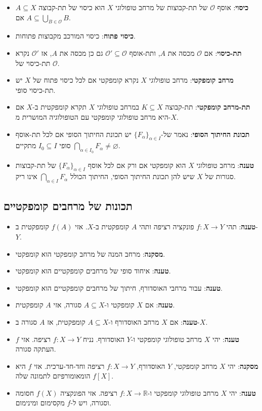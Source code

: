 \documentclass{tstextbook}
\begin{document}
\begin{summary}
  \begin{itemize}
    \item \textbf{כיסוי}: אוסף \(\mathcal{O}\) של תת-קבוצות של מרחב טופולוגי \(X\) הוא כיסוי של תת-קבוצה \(A \subseteq X\) אם \(A\subseteq \bigcup_{ B \in \mathcal{O}}B\).
    \item \textbf{כיסוי פתוח}: כיסוי המורכב מקבוצות פתוחות.
    \item \textbf{תת-כיסוי}: אם \(\mathcal{O}\) מכסה את \(A\), ותת-אוסף \(\mathcal{O}' \subseteq \mathcal{O}\) גם כן מכסה את \(A\), אז \(\mathcal{O}'\) נקרא תת-כיסוי של \(\mathcal{O}\).
    \item \textbf{מרחב קומפקטי}: מרחב טופולוגי \(X\) נקרא קומפקטי אם לכל כיסוי פתוח של \(X\) יש תת-כיסוי סופי.
    \item \textbf{תת-מרחב קומפקטי}: תת-קבוצה \(K\subseteq X\) במרחב טופולוגי \(X\) תקרא קומפקטית ב-\(X\) אם היא מרחב טופולוגי קומפקטי עם הטופולוגיה המושרית מ-\(X\).
    \item \textbf{תכונת החיתוך הסופי}: נאמר של-\(\{ F_{\alpha} \}_{\alpha \in I}\) יש תכונת החיתוך הסופי אם לכל תת-אוסף סופי \(I_{0} \subseteq I\) מתקיים \(\bigcap_{\alpha \in I_{0}}F_{\alpha }\neq \varnothing\).
    \item \textbf{טענה}: מרחב טופולוגי \(X\) הוא קומפקטי אם ורק אם לכל אוסף \(\{ F_{\alpha} \}_{\alpha \in I}\) של תת-קבוצות סגורות של \(X\) שיש להן תכונת החיתוך הסופי, החיתוך הכולל \(\bigcap_{\alpha \in I}F_{\alpha}\) אינו ריק.
  \end{itemize}
\hrulefill

\subsection{תכונות של מרחבים קומפקטיים}

  \begin{itemize}
    \item \textbf{טענה}: תהי \(f:X\to Y\) פונקציה רציפה ותהי \(A\) קומפקטית ב-\(X\). אזי \(f(A)\) קומפקטית ב-\(Y\).
    \item \textbf{מסקנה}: מרחב המנה של מרחב קומפקטי הוא קומפקטי.
    \item \textbf{טענה}: איחוד סופי של מרחבים קומפקטיים הוא קומפקטי.
    \item \textbf{טענה}: עבור מרחבי האוסדורף, חיתוך של מרחבים קומפקטיים הוא קומפקטי.
    \item \textbf{טענה}: אם \(X\) קומפקטי ו-\(A\subseteq X\) סגורה, אזי \(A\) קומפקטית.
    \item \textbf{טענה}: אם \(X\) מרחב האוסדורף ו-\(A\subseteq X\) קומפקטית, אז \(A\) סגורה ב-\(X\).
    \item \textbf{טענה}: יהי \(X\) מרחב טופולוגי קומפקטי ו-\(Y\) האוסדורף. נניח \(f:X\to Y\) רציפה. אזי \(f\) העתקה סגורה.
    \item \textbf{מסקנה}: יהי \(X\) מרחב קומפקטי, \(Y\) האוסדורף, \(f:X\to Y\) רציפה וחד-חד-ערכית. אזי \(f\) היא הומאומורפיזם לתמונה שלה \(f[X]\).
    \item \textbf{טענה}: יהי \(X\) מרחב טופולוגי קומפקטי ו-\(f:X\to \mathbb{R}\) רציפה. אזי הפונקציה \(f(X)\) חסומה וסגורה, ויש ל-\(f\) מקסימום ומינימום.
  \end{itemize}
\hrulefill


\end{summary}
\end{document}
